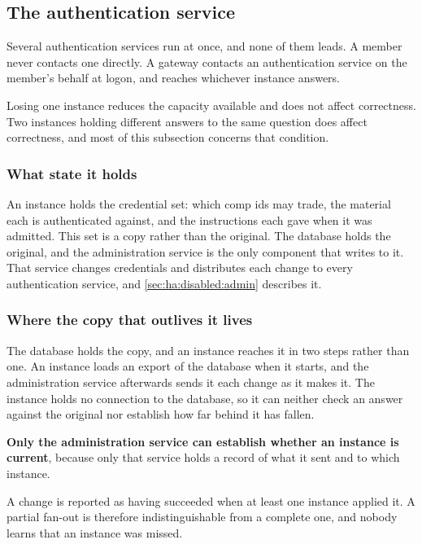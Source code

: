 \subsection{The authentication service}
\label{sec:ha:disabled:auth}

Several authentication services run at once, and none of them leads. A member
never contacts one directly. A gateway contacts an authentication service on the
member's behalf at logon, and reaches whichever instance answers.

Losing one instance reduces the capacity available and does not affect
correctness. Two instances holding different answers to the same question does
affect correctness, and most of this subsection concerns that condition.

\subsubsection{What state it holds}
\label{sec:ha:disabled:auth:state}

An instance holds the credential set: which comp ids may trade, the material each
is authenticated against, and the instructions each gave when it was admitted.
This set is a
copy rather than the original. The database holds the original, and the
administration service is the only component that writes to it. That service
changes credentials and distributes each change to every authentication service,
and \cref{sec:ha:disabled:admin} describes it.

\subsubsection{Where the copy that outlives it lives}
\label{sec:ha:disabled:auth:durable}

The database holds the copy, and an instance reaches it in two steps rather than
one. An instance loads an export of the database when it starts, and the
administration service afterwards sends it each change as it makes it. The
instance holds no connection to the database, so it can neither check an answer
against the original nor establish how far behind it has fallen.

\textbf{Only the administration service can establish whether an instance is
current}, because only that service holds a record of what it sent and to which
instance.

\begin{gap}{}
  A change is reported as having succeeded when at least one instance applied
  it. A partial fan-out is therefore indistinguishable from a complete one, and
  nobody learns that an instance was missed.
\end{gap}

